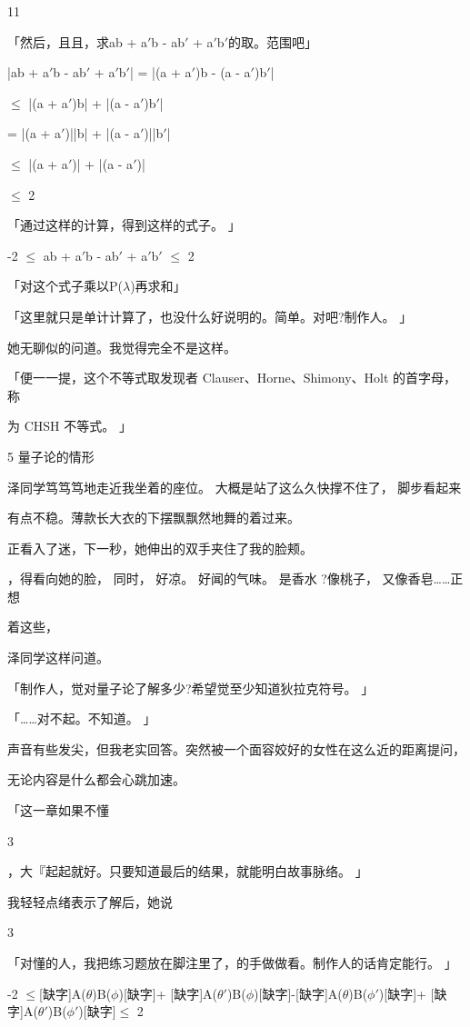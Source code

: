 11\par
「然后，且且，求ab + a$\prime$b - ab$\prime$ + a$\prime$b$\prime$的取。范围吧」\par
|ab + a$\prime$b - ab$\prime$ + a$\prime$b$\prime$| = |(a + a$\prime$)b - (a - a$\prime$)b$\prime$|\par
$\leq$ |(a + a$\prime$)b| + |(a - a$\prime$)b$\prime$|\par
= |(a + a$\prime$)||b| + |(a - a$\prime$)||b$\prime$|\par
$\leq$ |(a + a$\prime$)| + |(a - a$\prime$)|\par
$\leq$ 2\par
「通过这样的计算，得到这样的式子。 」\par
-2 $\leq$ ab + a$\prime$b - ab$\prime$ + a$\prime$b$\prime$ $\leq$ 2\par
「对这个式子乘以P($\lambda$)再求和」\par
「这里就只是单计计算了，也没什么好说明的。简单。对吧?制作人。 」\par
她无聊似的问道。我觉得完全不是这样。\par
「便一一提，这个不等式取发现者 Clauser、Horne、Shimony、Holt 的首字母，称\par
为 CHSH 不等式。 」\par
5 量子论的情形\par
泽同学笃笃笃地走近我坐着的座位。 大概是站了这么久快撑不住了， 脚步看起来\par
有点不稳。薄款长大衣的下摆飘飘然地舞的着过来。\par
正看入了迷，下一秒，她伸出的双手夹住了我的脸颊。\par
，得看向她的脸， 同时， 好凉。 好闻的气味。 是香水 ?像桃子， 又像香皂……正想\par
着这些，\par
泽同学这样问道。\par
「制作人，觉对量子论了解多少?希望觉至少知道狄拉克符号。 」\par
「……对不起。不知道。 」\par
声音有些发尖，但我老实回答。突然被一个面容姣好的女性在这么近的距离提问，\par
无论内容是什么都会心跳加速。\par
「这一章如果不懂\par
3\par
，大『起起就好。只要知道最后的结果，就能明白故事脉络。 」\par
我轻轻点绪表示了解后，她说\par
3\par
「对懂的人，我把练习题放在脚注里了，的手做做看。制作人的话肯定能行。 」\par
-2 $\leq$[缺字]A($\theta$)B($\phi$)[缺字]+ [缺字]A($\theta$$\prime$)B($\phi$)[缺字]-[缺字]A($\theta$)B($\phi$$\prime$)[缺字]+ [缺字]A($\theta$$\prime$)B($\phi$$\prime$)[缺字]$\leq$ 2\par


